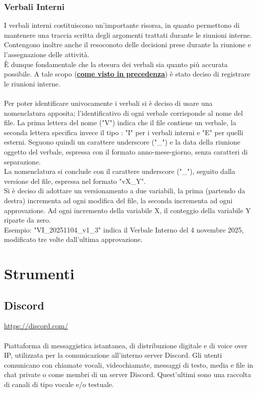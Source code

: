 \documentclass[a4paper,12pt]{article}
\begin{document}
\subsubsection{Verbali Interni}
I verbali interni costituiscono un'importante risorsa, in quanto permettono di mantenere una traccia scritta degli argomenti trattati durante le riunioni interne. Contengono inoltre anche il resoconoto delle decisioni prese durante la riunione e l'assegnazione delle attività.\\
È dunque fondamentale che la stesura dei verbali sia quanto più accurata possibile. A tale scopo (\textbf{\underline{\hyperref[subsec:riunioniInterne]{come visto in precedenza}}}) è stato deciso di registrare le riunioni interne.\\\\
Per poter identificare univocamente i verbali si è deciso di usare una nomenclatura apposita; l'identificativo di ogni verbale corrisponde al nome del file. La prima lettera del nome ("V") indica che il file contiene un verbale, la seconda lettera specifica invece il tipo : "I" per i verbali interni e "E" per quelli esterni. Seguono quindi un carattere underscore ("\_") e la data della riunione oggetto del verbale, espressa con il formato anno-mese-giorno, senza caratteri di separazione.\\
La nomenclatura si conclude con il carattere underscore ("\_"), seguito dalla versione del file, espressa nel formato "vX\_Y".\\
Si è deciso di adottare un versionamento a due variabili, la prima (partendo da destra) incrementa ad ogni modifica del file, la seconda incrementa ad ogni approvazione. Ad ogni incremento della variabile X, il conteggio della variabile Y riparte da zero.\\
Esempio: "VI\_20251104\_v1\_3" indica il Verbale Interno del 4 novembre 2025, modificato tre volte dall'ultima approvazione.



\newpage
\section{Strumenti}

\subsection{Discord} \label{strumenti:discord}
\underline{\url{https://discord.com/}} \\\\
Piattaforma di messaggistica istantanea, di distribuzione digitale e di voice over IP, utilizzata per la comunicazione all'interno server Discord.
Gli utenti comunicano con chiamate vocali, videochiamate, messaggi di testo, media e file in chat private o come membri di un server Discord. Quest'ultimi sono una raccolta di canali di tipo vocale e/o testuale. 
\end{document}
